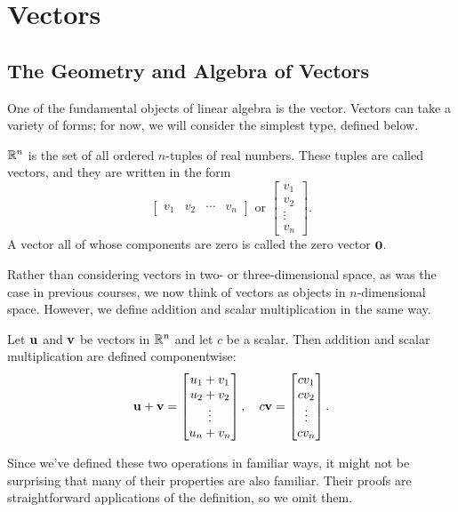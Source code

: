 \documentclass[../m073main.tex]{subfiles}
\begin{document}
\chapter{Vectors}
\section{The Geometry and Algebra of Vectors}
One of the fundamental objects of linear algebra is the vector.
Vectors can take a variety of forms; for now, we will consider the simplest type, defined below.

\begin{definition}[Vectors in $\R^n$]
	$\R^n$ is the set of all ordered $n$-tuples of real numbers.
	These tuples are called vectors, and they are written in the form
	\[ \begin{bmatrix} v_1 & v_2 & \cdots & v_n \end{bmatrix} \text{ or } \begin{bmatrix} v_1 \\ v_2 \\ \vdots \\ v_n \end{bmatrix}. \]
	A vector all of whose components are zero is called the zero vector $\mathbf{0}$.
\end{definition}

Rather than considering vectors in two- or three-dimensional space, as was the case in previous courses, we now think of vectors as objects in $n$-dimensional space.
However, we define addition and scalar multiplication in the same way.

\begin{definition}
	Let $\mathbf{u}$ and $\mathbf{v}$ be vectors in $\R^n$ and let $c$ be a scalar.
	Then addition and scalar multiplication are defined componentwise:
	\[ \mathbf{u} + \mathbf{v} = \begin{bmatrix} u_1 + v_1 \\ u_2 + v_2 \\ \vdots \\ u_n + v_n \end{bmatrix}, \quad c \mathbf{v} = \begin{bmatrix} cv_1 \\ cv_2 \\ \vdots \\ cv_n \end{bmatrix}. \]
\end{definition}

Since we've defined these two operations in familiar ways, it might not be surprising that many of their properties are also familiar.
Their proofs are straightforward applications of the definition, so we omit them.
\end{document}

